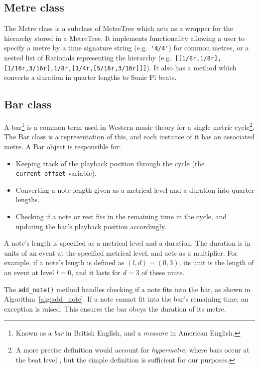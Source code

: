 \documentclass[12pt,twoside,openright]{report}
\begin{document}
\subsection{Metre class} \label{metre_class}

The Metre class is a subclass of MetreTree which acts as a wrapper for the
hierarchy stored in a MetreTree. It implements functionality allowing a user to
specify a metre by a time signature string (e.g.\ \verb|'4/4'|) for common metres, or a
nested list of Rationals representing the hierarchy (e.g.\ \verb'[[1/8r,1/8r],[1/16r,3/16r],1/8r,[1/4r,[5/16r,3/16r]]]'). It also has a method which
converts a duration in quarter lengths to Sonic
Pi beats.


\subsection{Bar class} \label{bar_class}

A bar\footnote{Known as a \emph{bar} in British English, and a \emph{measure} in American English.} is a common term used in Western music theory for a single
metric cycle\footnote{A more precise definition would account for \emph{hypermetre}, where bars occur at the beat level \cite{neal2000}, but the simple definition is sufficient for our purposes.}. The Bar class is a representation of this, and each instance of it
has an associated metre. A Bar object is responsible for:
\begin{itemize}
	\item Keeping track of the playback position through the cycle (the \verb'current_offset' variable).
	\item Converting a note length given as a metrical level and a duration into
quarter lengths.
	\item Checking if a note or rest fits in the remaining time in the cycle, and
updating the bar's playback position accordingly.
\end{itemize}

A note's length is specified as a metrical level and a duration. The duration
is in units of an event at the specified metrical level, and acts as a multiplier.
For example, if a note's length is defined as $(l,d)=(0,3)$, its unit is the length of an event at level $l=0$, and it lasts for $d=3$ of these units.

The \verb'add_note()' method handles checking if a note fits into the bar, as shown in
Algorithm~\ref{alg:add_note}. If a note cannot fit into the bar's remaining time,
an exception is raised. This ensures the bar obeys the duration of its metre.
\end{document}

